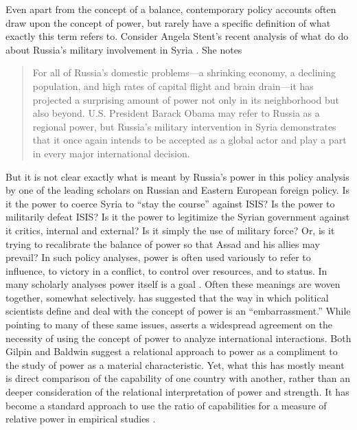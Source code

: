 \documentclass[12pt,oneside,doublespace,pdflatex]{amsart}
\begin{document}
Even apart from the concept of a balance, contemporary policy accounts often draw upon the concept of power, but rarely have a specific definition of what exactly this term refers to. Consider Angela Stent's recent analysis of what do do about Russia's military involvement in Syria 
\cite{stint:2016}. She notes
\begin{quote}
For all of Russia's domestic problems---a shrinking economy, a declining population, and high rates of capital flight and brain drain---it has projected a surprising amount of power not only in its neighborhood but also beyond. U.S. President Barack Obama may refer to Russia as a regional power, but Russia's military intervention in Syria demonstrates that it once again intends to be accepted as a global actor and play a part in every major international decision.
\end{quote}
But it is not clear exactly what is meant by Russia's power in this policy analysis by one of the leading scholars on Russian and Eastern European foreign policy. Is it the power to coerce Syria to ``stay the course'' against ISIS? Is the power to militarily defeat ISIS?  Is it the power to legitimize the Syrian government against it critics, internal and external? Is it simply the use of military force? Or, is it trying to recalibrate the balance of power so that Assad and his allies may prevail? In such policy analyses, power is often used variously to refer to influence, to victory in a conflict, to control over resources, and to status.  In many scholarly 
analyses power itself is a goal \citep{morgenthau:1948,waltz:1979}.  Often these meanings are woven together, somewhat selectively. 
\citet[page 24]{gilpin:1975} has suggested that the way in which political scientists define and deal with the concept of power is
an ``embarrassment.''  While pointing to many of these same issues, \citet{baldwin:1978} asserts
a widespread agreement on the necessity of using the concept of power to analyze international interactions. Both Gilpin and Baldwin suggest a relational approach to power as a compliment to the study of power as a material characteristic.
Yet, what this has mostly meant is direct comparison of the capability of one country with another, rather than an deeper consideration of the relational interpretation of power and strength.  
It has become a standard approach to use the ratio of capabilities for a measure of relative power in 
empirical studies 
\citep[among others]{slantchev:2004,reed:etal:2008,butler:gates:2009,gartzke:weisiger:2014,carter:poast:2015}.
\end{document}
